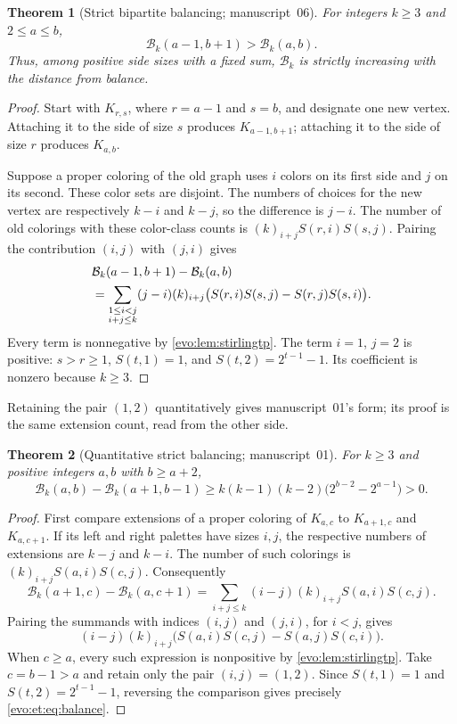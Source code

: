 \documentclass[11pt,a4paper]{article}
\numberwithin{equation}{section}
\newtheorem{theorem}{Theorem}[section]
\theoremstyle{definition}
\theoremstyle{remark}
\newcommand{\fall}[2]{(#1)_{#2}}
\newcommand{\Bip}{\mathcal B}
\begin{document}
\begin{theorem}[Strict bipartite balancing; manuscript~06]\label{evo:thm:balance}
For integers $k\ge3$ and $2\le a\le b$,
\begin{equation}\label{evo:eq:balance}
 \Bip_k(a-1,b+1)>\Bip_k(a,b).
\end{equation}
Thus, among positive side sizes with a fixed sum, $\Bip_k$ is strictly
increasing with the distance from balance.
\end{theorem}
\begin{proof}
Start with $K_{r,s}$, where $r=a-1$ and $s=b$, and designate one new vertex.
Attaching it to the side of size $s$ produces $K_{a-1,b+1}$; attaching it to
the side of size $r$ produces $K_{a,b}$.

Suppose a proper coloring of the old graph uses $i$ colors on its first side
and $j$ on its second. These color sets are disjoint. The numbers of choices
for the new vertex are respectively $k-i$ and $k-j$, so the difference is
$j-i$. The number of old colorings with these color-class counts is
$\fall{k}{i+j}S(r,i)S(s,j)$. Pairing the contribution $(i,j)$ with $(j,i)$
gives
\begin{align}
&\Bip_k(a-1,b+1)-\Bip_k(a,b)\notag\\
&=\sum_{\substack{1\le i<j\\i+j\le k}}
 (j-i)\fall{k}{i+j}
 \bigl(S(r,i)S(s,j)-S(r,j)S(s,i)\bigr).
 \label{evo:eq:balancedifference}
\end{align}
Every term is nonnegative by \cref{evo:lem:stirlingtp}. The term $i=1$,
$j=2$ is positive: $s>r\ge1$, $S(t,1)=1$, and $S(t,2)=2^{t-1}-1$. Its
coefficient is nonzero because $k\ge3$.
\end{proof}

Retaining the pair $(1,2)$ quantitatively gives manuscript~01's form; its
proof is the same extension count, read from the other side.

\begin{theorem}[Quantitative strict balancing; manuscript~01]\label{evo:et:thm:balance}
For $k\ge3$ and positive integers $a,b$ with $b\ge a+2$,
\begin{equation}\label{evo:et:eq:balance}
 \Bip_k(a,b)-\Bip_k(a+1,b-1)
 \ge k(k-1)(k-2)\bigl(2^{b-2}-2^{a-1}\bigr)>0.
\end{equation}
\end{theorem}
\begin{proof}
First compare extensions of a proper coloring of $K_{a,c}$ to $K_{a+1,c}$ and
$K_{a,c+1}$. If its left and right palettes have sizes $i,j$, the respective
numbers of extensions are $k-j$ and $k-i$. The number of such colorings is
$\fall{k}{i+j}S(a,i)S(c,j)$. Consequently
\[
 \Bip_k(a+1,c)-\Bip_k(a,c+1)
 =\sum_{i+j\le k}(i-j)\fall{k}{i+j}S(a,i)S(c,j).
\]
Pairing the summands with indices $(i,j)$ and $(j,i)$, for $i<j$, gives
\[
 (i-j)\fall{k}{i+j}\bigl(S(a,i)S(c,j)-S(a,j)S(c,i)\bigr).
\]
When $c\ge a$, every such expression is nonpositive by
\cref{evo:lem:stirlingtp}. Take $c=b-1>a$ and retain only the pair
$(i,j)=(1,2)$. Since $S(t,1)=1$ and $S(t,2)=2^{t-1}-1$, reversing the
comparison gives precisely \eqref{evo:et:eq:balance}.
\end{proof}
\end{document}
